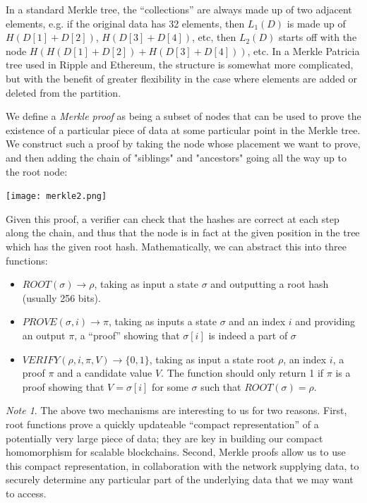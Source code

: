 \documentclass[11pt,a4paper]{article}
\makeatletter
\theoremstyle{plain}
\theoremstyle{definition}
\theoremstyle{remark}
\newtheorem*{note}{Note}
\newcommand{\eg}{e.g.\@\xspace}
\makeatother
\begin{document}
In a standard Merkle tree, the ``collections'' are always made up of two adjacent elements, \eg if the original data has 32 elements, then $L_1(D)$ is made up of $H(D[1] + D[2])$, $H(D[3] + D[4])$, etc, then $L_2(D)$ starts off with the node $H(H(D[1] + D[2]) + H(D[3] + D[4]))$, etc. In a Merkle Patricia tree\cite{mpt} used in Ripple and Ethereum, the structure is somewhat more complicated, but with the benefit of greater flexibility in the case where elements are added or deleted from the partition.

We define a \emph{Merkle proof} as being a subset of nodes that can be used to prove the existence of a particular piece of data at some particular point in the Merkle tree. We construct such a proof by taking the node whose placement we want to prove, and then adding the chain of "siblings" and "ancestors" going all the way up to the root node:

\begin{center}
\texttt{[image: merkle2.png]}
\end{center}

Given this proof, a verifier can check that the hashes are correct at each step along the chain, and thus that the node is in fact at the given position in the tree which has the given root hash. Mathematically, we can abstract this into three functions:

\begin{itemize}
\item
$ROOT(\sigma) \rightarrow \rho$, taking as input a state $\sigma$ and outputting a root hash (usually 256 bits).
\item
$PROVE(\sigma, i) \rightarrow \pi$, taking as inputs a state $\sigma$ and an index $i$ and providing an output $\pi$, a ``proof'' showing that $\sigma[i]$ is indeed a part of $\sigma$
\item
$VERIFY(\rho, i, \pi, V) \rightarrow \{0, 1\}$, taking as input a state root $\rho$, an index $i$, a proof $\pi$ and a candidate value $V$. The function should only return 1 if $\pi$ is a proof showing that $V = \sigma[i]$ for some $\sigma$ such that $ROOT(\sigma) = \rho$.
\end{itemize}

\begin{note}
The above two mechanisms are interesting to us for two reasons. First, root functions prove a quickly updateable ``compact representation'' of a potentially very large piece of data; they are key in building our compact homomorphism for scalable blockchains. Second, Merkle proofs allow us to use this compact representation, in collaboration with the network supplying data, to securely determine any particular part of the underlying data that we may want to access.
\end{note}
\end{document}
